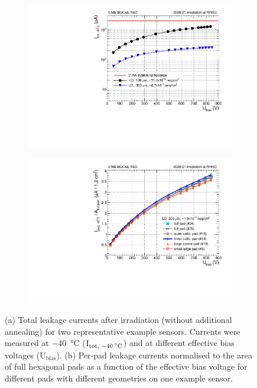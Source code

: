 \begin{figure}
	\captionsetup[subfigure]{aboveskip=-1pt,belowskip=-1pt}
	\centering
	\begin{subfigure}[b]{0.49\textwidth}
		\includegraphics[width=0.999\textwidth]{plots/total_iv/total_current_IV.pdf}
		\subcaption{
		}
		\label{plot:tot_IV_good}
    \end{subfigure}
    \hfill
    \begin{subfigure}[b]{0.49\textwidth}
        \includegraphics[width=0.999\textwidth]{plots/channel_iv/channel_IV_sensors_channels.pdf}
        \subcaption{
        }
        \label{plot:pad_IV_channels}
    \end{subfigure}

	\caption{
		(a) Total leakage currents after irradiation (without additional annealing) for two representative example sensors. 
		Currents were measured at \SI{-40}{\celsius} ($\text{I}_\text{tot, \SI{-40}{\celsius}}$) and at different effective bias voltages ($\text{U}_\text{bias}$). 
        (b) Per-pad leakage currents normalised to the area of full hexagonal pads as a function of the effective bias voltage for different pads with different geometries on one example sensor.
	}
\end{figure}
